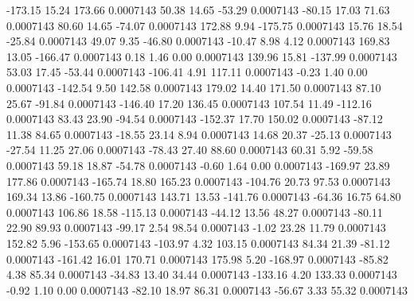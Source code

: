      -173.15       15.24      173.66     0.0007143
       50.38       14.65      -53.29     0.0007143
      -80.15       17.03       71.63     0.0007143
       80.60       14.65      -74.07     0.0007143
      172.88        9.94     -175.75     0.0007143
       15.76       18.54      -25.84     0.0007143
       49.07        9.35      -46.80     0.0007143
      -10.47        8.98        4.12     0.0007143
      169.83       13.05     -166.47     0.0007143
        0.18        1.46        0.00     0.0007143
      139.96       15.81     -137.99     0.0007143
       53.03       17.45      -53.44     0.0007143
     -106.41        4.91      117.11     0.0007143
       -0.23        1.40        0.00     0.0007143
     -142.54        9.50      142.58     0.0007143
      179.02       14.40      171.50     0.0007143
       87.10       25.67      -91.84     0.0007143
     -146.40       17.20      136.45     0.0007143
      107.54       11.49     -112.16     0.0007143
       83.43       23.90      -94.54     0.0007143
     -152.37       17.70      150.02     0.0007143
      -87.12       11.38       84.65     0.0007143
      -18.55       23.14        8.94     0.0007143
       14.68       20.37      -25.13     0.0007143
      -27.54       11.25       27.06     0.0007143
      -78.43       27.40       88.60     0.0007143
       60.31        5.92      -59.58     0.0007143
       59.18       18.87      -54.78     0.0007143
       -0.60        1.64        0.00     0.0007143
     -169.97       23.89      177.86     0.0007143
     -165.74       18.80      165.23     0.0007143
     -104.76       20.73       97.53     0.0007143
      169.34       13.86     -160.75     0.0007143
      143.71       13.53     -141.76     0.0007143
      -64.36       16.75       64.80     0.0007143
      106.86       18.58     -115.13     0.0007143
      -44.12       13.56       48.27     0.0007143
      -80.11       22.90       89.93     0.0007143
      -99.17        2.54       98.54     0.0007143
       -1.02       23.28       11.79     0.0007143
      152.82        5.96     -153.65     0.0007143
     -103.97        4.32      103.15     0.0007143
       84.34       21.39      -81.12     0.0007143
     -161.42       16.01      170.71     0.0007143
      175.98        5.20     -168.97     0.0007143
      -85.82        4.38       85.34     0.0007143
      -34.83       13.40       34.44     0.0007143
     -133.16        4.20      133.33     0.0007143
       -0.92        1.10        0.00     0.0007143
      -82.10       18.97       86.31     0.0007143
      -56.67        3.33       55.32     0.0007143

